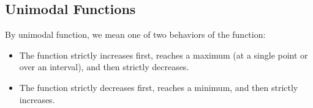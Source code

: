 \subsection{Unimodal Functions}

By unimodal function, we mean one of two behaviors of the function:

\begin{itemize}
  \item The function strictly increases first, reaches a maximum (at a single point or over an interval), and then strictly decreases.
  \item The function strictly decreases first, reaches a minimum, and then strictly increases.
\end{itemize}

\begin{figure}[ht]
    \centering
\end{figure}

